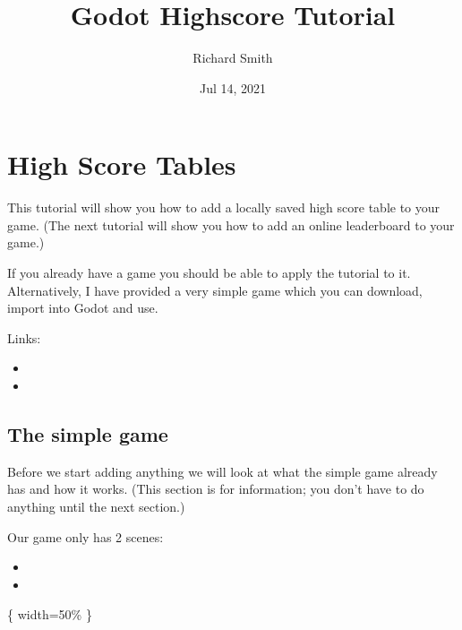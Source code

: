 \documentclass[letterpaper,10pt,english]{sphinxmanual}
\title{Godot Highscore Tutorial}
\date{Jul 14, 2021}
\author{Richard Smith}
\begin{document}
\pagestyle{empty}
\sphinxmaketitle
\pagestyle{plain}
\sphinxtableofcontents
\pagestyle{normal}
\label{\detokenize{index::doc}}



\chapter{High Score Tables}
\label{\detokenize{pandoc_tut:high-score-tables}}\label{\detokenize{pandoc_tut::doc}}
\sphinxAtStartPar
This tutorial will show you how to add a locally saved high score table to your game. (The next
tutorial will show you how to add an online leaderboard to your game.)

\sphinxAtStartPar
If you already have a game you should be able to apply the tutorial to it.  Alternatively,
I have provided a very simple game which you can download, import into Godot and use.

\sphinxAtStartPar
Links:
\begin{itemize}
\item {} 
\sphinxAtStartPar
{}

\item {} 
\sphinxAtStartPar
{}

\end{itemize}


\section{The simple game}
\label{\detokenize{pandoc_tut:the-simple-game}}
\sphinxAtStartPar
Before we start adding anything we will look at what the simple game already has and how it works.
(This section is for information; you don’t have to do anything until the next section.)

\sphinxAtStartPar
Our game only has 2 scenes:
\begin{itemize}
\item {} 
\sphinxAtStartPar
{}

\item {} 
\sphinxAtStartPar
{}

\end{itemize}

\sphinxAtStartPar
{}\{ width=50\% \}
\end{document}
